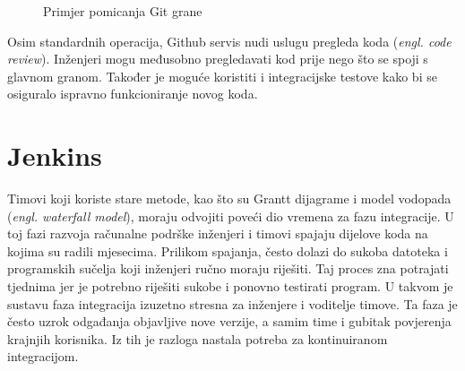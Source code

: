 \begin{figure}[h]
    \centering

    \caption{Primjer pomicanja Git grane}%
    \label{fig:02gitexample2}
\end{figure}

Osim standardnih operacija, Github servis nudi uslugu pregleda koda (\textit{engl. code review}).
Inženjeri mogu međusobno pregledavati kod prije nego što se spoji s glavnom granom. Također je
moguće koristiti i integracijske testove kako bi se osiguralo ispravno funkcioniranje novog koda.

\section{Jenkins}
Timovi koji koriste stare metode, kao što su Grantt dijagrame i model vodopada (\textit{engl.
waterfall model}), moraju odvojiti poveći dio vremena za fazu integracije. U toj fazi razvoja
računalne podrške inženjeri i timovi spajaju dijelove koda na kojima su radili mjesecima. Prilikom
spajanja, često dolazi do sukoba datoteka i programskih sučelja koji inženjeri ručno moraju
riješiti. Taj proces zna potrajati tjednima jer je potrebno riješiti sukobe i ponovno testirati
program. U takvom je sustavu faza integracija izuzetno stresna za inženjere i voditelje timove. Ta
faza je često uzrok odgađanja objavljive nove verzije, a samim time i gubitak povjerenja krajnjih
korisnika. Iz tih je razloga nastala potreba za kontinuiranom integracijom.

